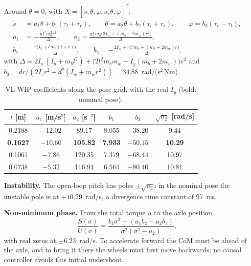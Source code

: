 \documentclass[11pt,a4paper]{article}
\begin{document}
Around $\theta = 0$, with $X = [s,\theta,\varphi,\dot s,\dot\theta,\dot\varphi]^T$:
\begin{align}
    \ddot s &= a_1\theta + b_1(\tau_l+\tau_r),\qquad
    \ddot\theta = a_2\theta + b_2(\tau_l+\tau_r),\qquad
    \ddot\varphi = b_3(\tau_r-\tau_l),\\
    a_1 &= -\frac{g\,l^2m_b^2r^2}{\Delta},\qquad
    a_2 = \frac{g\,l\,m_b\big(2I_w+(m_b+2m_w)r^2\big)}{\Delta},\\
    b_1 &= \frac{r\big(I_y+l\,m_b(l+r)\big)}{\Delta},\qquad
    b_2 = -\frac{2I_w+r\big(l\,m_b+(m_b+2m_w)r\big)}{\Delta},
\end{align}
with $\Delta = 2I_w(I_y+m_bl^2) + \big(2l^2m_bm_w + I_y(m_b+2m_w)\big)r^2$ and
$b_3 = dr/(2I_zr^2 + d^2(I_w+m_wr^2)) = 34.88$~rad/(s$^2$\,Nm).

\begin{table}[H]
    \centering
    \caption{VL-WIP coefficients along the pose grid, with the real $I_y$ (bold: nominal pose).}
    \label{tab:vlwip}
    \begin{tabular}{cccccc}
        \toprule
        $l$ [m] & $a_1$ [m/s$^2$] & $a_2$ [s$^{-2}$] & $b_1$ & $b_2$ & $\sqrt{a_2}$ [rad/s] \\
        \midrule
        0.2188 & $-12.02$ & 89.17 & 8.055 & $-38.20$ & 9.44 \\
        \textbf{0.1627} & $\bm{-10.60}$ & \textbf{105.82} & \textbf{7.933} & $\bm{-50.15}$ & \textbf{10.29} \\
        0.1061 & $-7.86$ & 120.35 & 7.379 & $-68.44$ & 10.97 \\
        0.0738 & $-5.32$ & 116.94 & 6.564 & $-80.40$ & 10.81 \\
        \bottomrule
    \end{tabular}
\end{table}

\textbf{Instability.}  The open-loop pitch has poles $\pm\sqrt{a_2}$: in the nominal pose the
unstable pole is at $+10.29$~rad/s, a divergence time constant of 97~ms.

\textbf{Non-minimum phase.}  From the total torque $u$ to the axle position
\begin{equation}
    \frac{S(\sigma)}{U(\sigma)}=\frac{b_1\sigma^2+(a_1b_2-a_2b_1)}{\sigma^2(\sigma^2-a_2)},
\end{equation}
with real zeros at $\pm6.23$~rad/s.  To accelerate forward the CoM must be ahead of the axle,
and to bring it there the wheels must first move backwards; no causal controller avoids this
initial undershoot.
\end{document}
